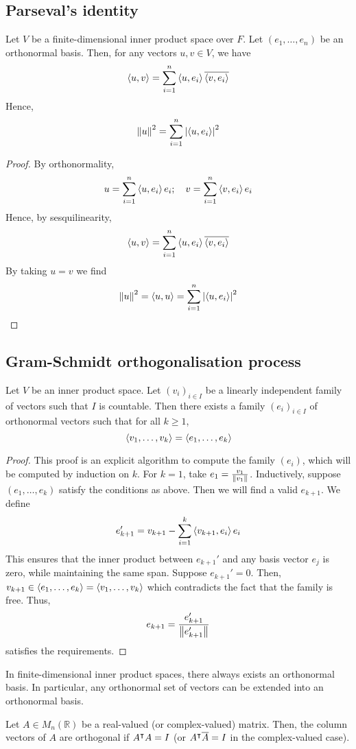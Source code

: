 \subsection{Parseval's identity}
\begin{corollary}
	Let \( V \) be a finite-dimensional inner product space over \( F \).
	Let \( (e_1, \dots, e_n) \) be an orthonormal basis.
	Then, for any vectors \( u, v \in V \), we have
	\[
		\left\langle{u, v}\right\rangle = \sum_{i=1}^n \left\langle{u, e_i}\right\rangle \overline{\left\langle{v, e_i}\right\rangle}
	\]
	Hence,
	\[
		\norm{u}^2 = \sum_{i=1}^n \abs{\left\langle{u,e_i}\right\rangle}^2
	\]
\end{corollary}
\begin{proof}
	By orthonormality,
	\[
		u = \sum_{i=1}^n \left\langle{u, e_i}\right\rangle e_i;\quad v = \sum_{i=1}^n \left\langle{v, e_i}\right\rangle e_i
	\]
	Hence, by sesquilinearity,
	\[
		\left\langle{u,v}\right\rangle = \sum_{i=1}^n \left\langle{u, e_i}\right\rangle \overline{\left\langle{v, e_i}\right\rangle}
	\]
	By taking \( u = v \) we find
	\[
		\norm{u}^2 = \left\langle{u,u}\right\rangle = \sum_{i=1}^n \abs{\left\langle{u,e_i}\right\rangle}^2
	\]
\end{proof}

\subsection{Gram-Schmidt orthogonalisation process}
\begin{theorem}
	Let \( V \) be an inner product space.
	Let \( (v_i)_{i \in I} \) be a linearly independent family of vectors such that \( I \) is countable.
	Then there exists a family \( (e_i)_{i \in I} \) of orthonormal vectors such that for all \( k \geq 1 \),
	\[
		\langle{} v_1, \dots, v_k \rangle = \langle{} e_1, \dots, e_k \rangle
	\]
\end{theorem}
\begin{proof}
	This proof is an explicit algorithm to compute the family \( (e_i) \), which will be computed by induction on \( k \).
	For \( k = 1 \), take \( e_1 = \frac{v_1}{\norm{v_1}} \).
	Inductively, suppose \( (e_1, \dots, e_k) \) satisfy the conditions as above.
	Then we will find a valid \( e_{k+1} \).
	We define
	\[
		e_{k+1}' = v_{k+1} - \sum_{i=1}^k \left\langle{v_{k+1}, e_i}\right\rangle e_i
	\]
	This ensures that the inner product between \( e_{k+1}' \) and any basis vector \( e_j \) is zero, while maintaining the same span.
	Suppose \( e_{k+1}' = 0 \).
	Then, \( v_{k+1} \in \langle{} e_1, \dots, e_k \rangle = \langle{} v_1, \dots, v_k \rangle \) which contradicts the fact that the family is free.
	Thus,
	\[
		e_{k+1} = \frac{e_{k+1}'}{\norm{e_{k+1}'}}
	\]
	satisfies the requirements.
\end{proof}
\begin{corollary}
	In finite-dimensional inner product spaces, there always exists an orthonormal basis.
	In particular, any orthonormal set of vectors can be extended into an orthonormal basis.
\end{corollary}
\begin{remark}
	Let \( A \in M_n(\mathbb R) \) be a real-valued (or complex-valued) matrix.
	Then, the column vectors of \( A \) are orthogonal if \( A^\intercal A = I \) (or \( A^\intercal \overline A = I \) in the complex-valued case).
\end{remark}

